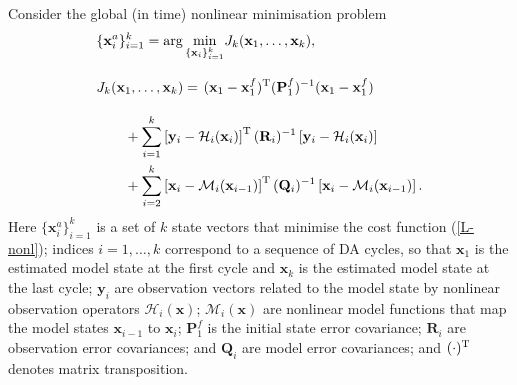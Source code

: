 \documentclass[11pt]{report}
\newcommand{\mb} {\mathbf}
\newcommand{\T}{^{\tiny \mathrm T}}
\begin{document}
Consider the global (in time) nonlinear minimisation problem
\begin{align}
  \label{min-nonl}
  &\{\mb x_i^a\}_{i=1}^k = \arg \underset{\{\mb x_i\}_{i = 1}^k}\min J_k(\mb x_1, \dots, \mb x_k),\\
  \nonumber
  &J_k(\mb x_1, \dots, \mb x_k)  = \left . (\mb x_1 - \mb x_1^f)\T (\mb P_1^f)^{-1} (\mb x_1 - \mb x_1^f) 
  \vphantom{\sum_{i = 2}^{k}}
  \right . \\
  \nonumber
  & \qquad + \sum_{i = 1}^k \left [ \mb y_i - \mathcal H_i(\mb x_i) \right ] \T (\mb R_i)^{-1} \left [ \mb y_i - \mathcal H_i(\mb x_i) \right ] \\ 
  & \qquad + \sum_{i = 2}^k \left [ \mb x_i - \mathcal M_i(\mb x_{i-1}) \right ]\T (\mb Q_i)^{-1} \left [ \mb x_i - \mathcal M_i(\mb x_{i-1}) \right ].
  \label{L-nonl}
\end{align}
Here $\{\mb x_i^a\}_{i=1}^k$ is a set of $k$ state vectors that minimise the cost function (\ref{L-nonl}); indices $i = 1,\dots,k$ correspond to a sequence of DA cycles, so that $\mb x_1$ is the estimated model state at the first cycle and $\mb x_k$ is the estimated model state at the last cycle; $\mb y_i$ are observation vectors related to the model state by nonlinear observation operators $\mathcal H_i(\mb x)$; $\mathcal M_i(\mb x)$ are nonlinear model functions that map the model states $\mb x_{i - 1}$ to $\mb x_i$; $\mb P_1^f$ is the initial state error covariance; $\mb R_i$ are observation error covariances; and $\mb Q_i$ are model error covariances; and $(\cdot)\T$ denotes matrix transposition.
\end{document}
